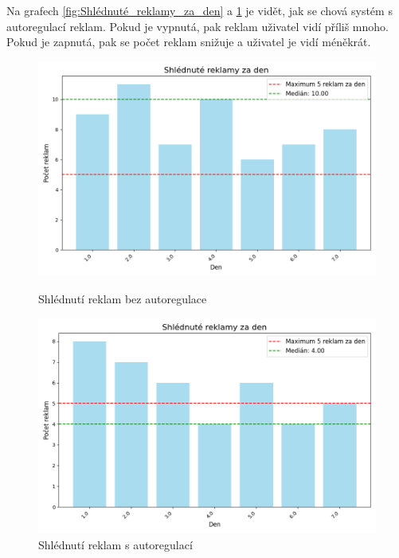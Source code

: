 \documentclass[11pt, a4paper]{article}
\begin{document}
Na grafech \ref{fig:Shlédnuté_reklamy_za_den} a \ref{fig:Shlédnuté_reklamy_za_den_auto} je vidět, jak se chová systém s autoregulací reklam.
Pokud je vypnutá, pak reklam uživatel vidí příliš mnoho. Pokud je zapnutá, pak se počet reklam snižuje a uživatel je vidí méněkrát.
\begin{figure}[h]
    \centering
    \begin{minipage}{0.49\linewidth}
        \centering
        \includegraphics[width=\linewidth]{Shlédnuté_reklamy_za_den.png}
        \caption{Shlédnutí reklam bez autoregulace}
        \label{fig:Shlédnuté_reklamy_za_den}
    \end{minipage}
    \hfill
    \begin{minipage}{0.49\linewidth}
        \centering
        \includegraphics[width=\linewidth]{Shlédnuté_reklamy_za_den_auto.png}
        \caption{Shlédnutí reklam s autoregulací}
        \label{fig:Shlédnuté_reklamy_za_den_auto}
    \end{minipage}
\end{figure}
\end{document}
